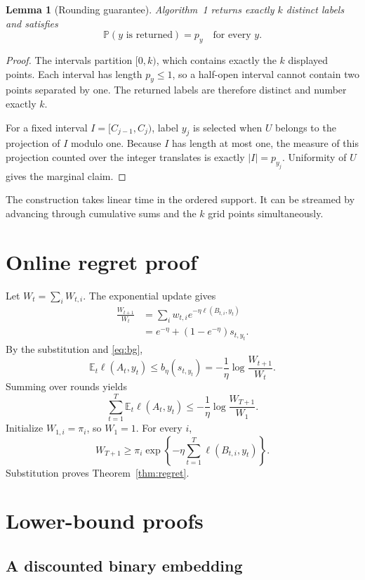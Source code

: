 \documentclass{article}
\newtheorem{lemma}[theorem]{Lemma}
\theoremstyle{definition}
\theoremstyle{remark}
\newcommand{\E}{\mathbb E}
\newcommand{\Pp}{\mathbb P}
\newcommand{\1}{\mathbf 1}
\begin{document}
\begin{lemma}[Rounding guarantee]
\label{lem:rounding}
Algorithm~1 returns exactly \(k\) distinct labels and satisfies \[ \Pp(y\text{ is returned})=p_y \quad\text{for every }y. \]
\end{lemma}

\begin{proof}
The intervals partition \([0,k)\), which contains exactly the \(k\) displayed points. Each interval has length \(p_y\le1\), so a half-open interval cannot contain two points separated by one. The returned labels are therefore distinct and number exactly \(k\).

For a fixed interval \(I=[C_{j-1},C_j)\), label \(y_j\) is selected when \(U\) belongs to the projection of \(I\) modulo one. Because \(I\) has length at most one, the measure of this projection counted over the integer translates is exactly \(|I|=p_{y_j}\). Uniformity of \(U\) gives the marginal claim.
\end{proof}

The construction takes linear time in the ordered support. It can be streamed by advancing through cumulative sums and the \(k\) grid points simultaneously.

\section{Online regret proof}
\label{app:online}

Let \(W_t=\sum_iW_{t,i}\). The exponential update gives
\begin{align}
\frac{W_{t+1}}{W_t}
&=\sum_iw_{t,i}e^{-\eta\ell(B_{t,i},y_t)}\nonumber\\
&=e^{-\eta}+(1-e^{-\eta})s_{t,y_t}.
\label{eq:potential-step}
\end{align}
By the substitution and \eqref{eq:bg}, \[ \E_t\ell(A_t,y_t) \le b_\eta(s_{t,y_t}) =-\frac1\eta\log\frac{W_{t+1}}{W_t}. \] Summing over rounds yields \[ \sum_{t=1}^T\E_t\ell(A_t,y_t) \le-\frac1\eta\log\frac{W_{T+1}}{W_1}. \] Initialize \(W_{1,i}=\pi_i\), so \(W_1=1\). For every \(i\), \[ W_{T+1} \ge\pi_i\exp\left\{-\eta\sum_{t=1}^T \ell(B_{t,i},y_t)\right\}. \] Substitution proves Theorem~\ref{thm:regret}.

\section{Lower-bound proofs}
\label{app:lower-proofs}

\subsection{A discounted binary embedding}
\end{document}
